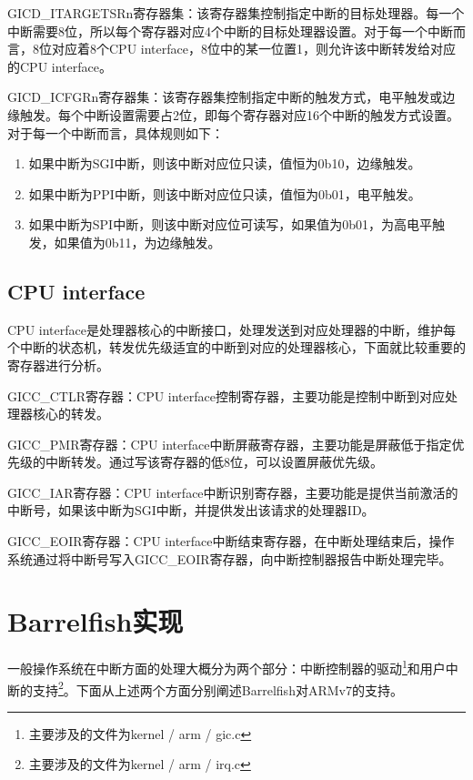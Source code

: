 \documentclass[a4paper, 12pt]{report}
\begin{document}
    GICD\_ITARGETSRn寄存器集：该寄存器集控制指定中断的目标处理器。每一个中断需要8位，所以每个寄存器对应4个中断的目标处理器设置。对于每一个中断而言，8位对应着8个CPU interface，8位中的某一位置1，则允许该中断转发给对应的CPU interface。
    
    GICD\_ICFGRn寄存器集：该寄存器集控制指定中断的触发方式，电平触发或边缘触发。每个中断设置需要占2位，即每个寄存器对应16个中断的触发方式设置。对于每一个中断而言，具体规则如下：
    
    \begin{enumerate}
        \item 如果中断为SGI中断，则该中断对应位只读，值恒为0b10，边缘触发。
        \item 如果中断为PPI中断，则该中断对应位只读，值恒为0b01，电平触发。
        \item 如果中断为SPI中断，则该中断对应位可读写，如果值为0b01，为高电平触发，如果值为0b11，为边缘触发。
    \end{enumerate}
    
    \subsection{CPU interface}
    
    CPU interface是处理器核心的中断接口，处理发送到对应处理器的中断，维护每个中断的状态机，转发优先级适宜的中断到对应的处理器核心，下面就比较重要的寄存器进行分析。

    GICC\_CTLR寄存器：CPU interface控制寄存器，主要功能是控制中断到对应处理器核心的转发。
    
    GICC\_PMR寄存器：CPU interface中断屏蔽寄存器，主要功能是屏蔽低于指定优先级的中断转发。通过写该寄存器的低8位，可以设置屏蔽优先级。
    
    GICC\_IAR寄存器：CPU interface中断识别寄存器，主要功能是提供当前激活的中断号，如果该中断为SGI中断，并提供发出该请求的处理器ID。
    
    GICC\_EOIR寄存器：CPU interface中断结束寄存器，在中断处理结束后，操作系统通过将中断号写入GICC\_EOIR寄存器，向中断控制器报告中断处理完毕。
    
    \section{Barrelfish实现}
    
    一般操作系统在中断方面的处理大概分为两个部分：中断控制器的驱动\footnote{主要涉及的文件为kernel / arm / gic.c}和用户中断的支持\footnote{主要涉及的文件为kernel / arm / irq.c}。下面从上述两个方面分别阐述Barrelfish对ARMv7的支持。
    
\end{document}
